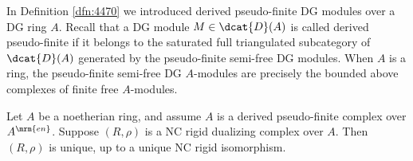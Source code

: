 In Definition \ref{dfn:4470} we introduced derived pseudo-finite DG modules
over a DG ring $A$. Recall that a DG module $M \in \dcat{D}(A)$ is called 
derived pseudo-finite if it belongs to the saturated full triangulated 
subcategory of $\dcat{D}(A)$ generated by the pseudo-finite semi-free DG 
modules. When $A$ is a ring, the pseudo-finite semi-free DG $A$-modules are 
precisely the bounded above complexes of finite free $A$-modules. 

\begin{thm} \label{thm:4380} 
Let $A$ be a noetherian ring, and assume $A$ is a derived pseudo-finite complex 
over $A^{\mrm{en}}$. Suppose $(R, \rho)$ is a NC rigid dualizing complex over 
$A$. Then $(R, \rho)$ is unique, up to a unique NC rigid isomorphism.
\end{thm}

